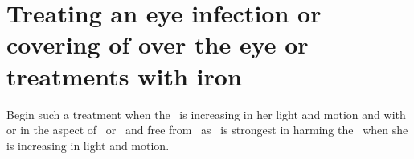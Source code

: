 \section{Treating an eye infection or covering of over the eye or treatments with iron}
Begin such a treatment when the \Moon\, is increasing in her light and motion and with or in the aspect of \Jupiter\, or \Venus\, and free from \Mars\, as \Mars\, is strongest in harming the \Moon\, when she is increasing in light and motion.
